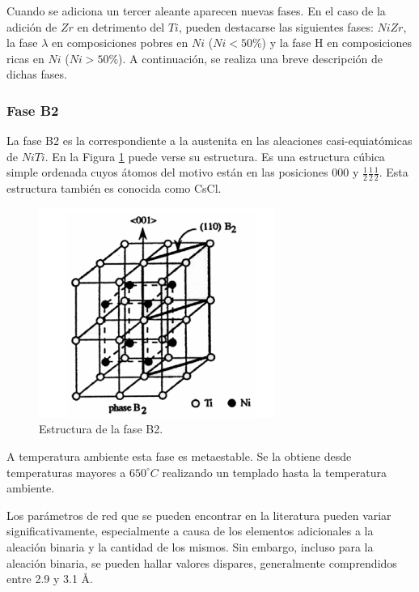 \documentclass[12pt]{article}
\theoremstyle{definition}
\theoremstyle{remark}
\begin{document}
Cuando se adiciona un tercer aleante aparecen nuevas fases. En el caso de la adición de $Zr$ en detrimento del $Ti$, pueden destacarse las siguientes fases: $NiZr$, la fase $\lambda$ en composiciones pobres en $Ni$ ($Ni < 50\%$) y la fase H en composiciones ricas en $Ni$ ($Ni > 50\%$). A continuación, se realiza una breve descripción de dichas fases.

\subsubsection{Fase B2}
La fase B2 es la correspondiente a la austenita en las aleaciones casi-equiatómicas de $NiTi$. En la Figura \ref{B2phase} puede verse su estructura. Es una estructura cúbica simple ordenada cuyos átomos del motivo están en las posiciones 000 y $\frac{1}{2}\frac{1}{2}\frac{1}{2}$. Esta estructura también es conocida como CsCl.
\begin{figure}[H]
	\centering
	\includegraphics[scale=0.5]{img/B2Phase.png}
	\caption{Estructura de la fase B2.}
	\label{B2phase}
\end{figure}

A temperatura ambiente esta fase es metaestable. Se la obtiene desde temperaturas mayores a $650 ^\circ C$ realizando un templado hasta la temperatura ambiente.

Los parámetros de red que se pueden encontrar en la literatura pueden variar significativamente, especialmente a causa de los elementos adicionales a la aleación binaria y la cantidad de los mismos. Sin embargo, incluso para la aleación binaria, se pueden hallar valores dispares, generalmente comprendidos entre 2.9 y 3.1 \AA.
\end{document}
